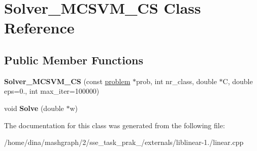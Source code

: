 \hypertarget{class_solver___m_c_s_v_m___c_s}{\section{Solver\-\_\-\-M\-C\-S\-V\-M\-\_\-\-C\-S Class Reference}
\label{class_solver___m_c_s_v_m___c_s}
}
\subsection*{Public Member Functions}
\begin{DoxyCompactItemize}
\item 
\hypertarget{class_solver___m_c_s_v_m___c_s_a71fd9e25a3e06042359f67b03be31e5d}{{\bfseries Solver\-\_\-\-M\-C\-S\-V\-M\-\_\-\-C\-S} (const \hyperlink{structproblem}{problem} $\ast$prob, int nr\-\_\-class, double $\ast$C, double eps=0., int max\-\_\-iter=100000)}\label{class_solver___m_c_s_v_m___c_s_a71fd9e25a3e06042359f67b03be31e5d}

\item 
\hypertarget{class_solver___m_c_s_v_m___c_s_a1bb076b82ffb6568ff3adbca771abf31}{void {\bfseries Solve} (double $\ast$w)}\label{class_solver___m_c_s_v_m___c_s_a1bb076b82ffb6568ff3adbca771abf31}

\end{DoxyCompactItemize}


The documentation for this class was generated from the following file\-:\begin{DoxyCompactItemize}
\item 
/home/dina/mashgraph/2/sse\-\_\-task\-\_\-prak\-\_/externals/liblinear-\/1./linear.\-cpp\end{DoxyCompactItemize}
